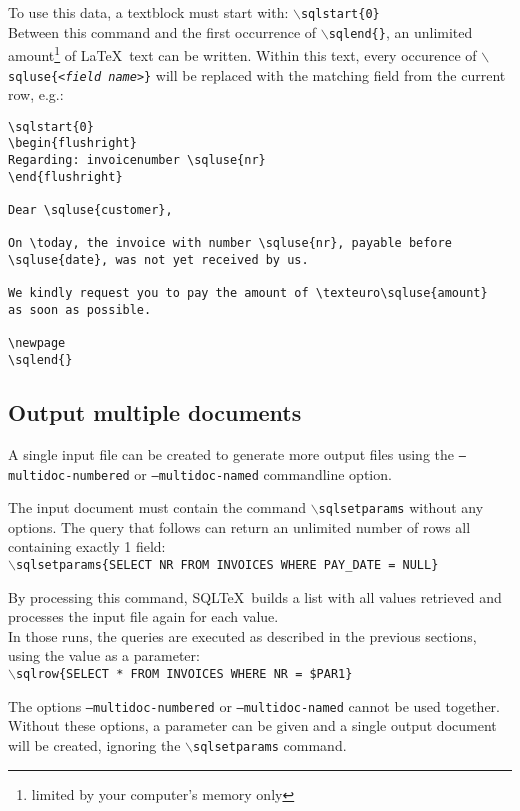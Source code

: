 \documentclass{article}
\newcommand{\bs}{\ensuremath{\backslash}}
\newcommand{\vs}{\vspace{3mm}}
\begin{document}
\vs

To use this data, a textblock must start with: \texttt{\bs sqlstart\{0\}}\\
Between this command and the first occurrence of \texttt{\bs sqlend\{\}}, an unlimited amount\footnote{ limited by your computer's memory only} of \LaTeX\ text can be written. Within this text, every occurence of \texttt{\bs sqluse\{<\textit{field name}>\}} will be replaced with the matching field from the current row, e.g.:

\noindent\begin{verbatim}
\sqlstart{0}
\begin{flushright}
Regarding: invoicenumber \sqluse{nr}
\end{flushright}

Dear \sqluse{customer},

On \today, the invoice with number \sqluse{nr}, payable before
\sqluse{date}, was not yet received by us.

We kindly request you to pay the amount of \texteuro\sqluse{amount}
as soon as possible.

\newpage
\sqlend{}
\end{verbatim}


\subsection{Output multiple documents}\label{multidoc}

A single input file can be created to generate more output files using the \texttt{--multidoc-numbered} or \texttt{--multidoc-named} commandline option.

The input document must contain the command \texttt{\bs sqlsetparams} without any options. The query that follows can return an unlimited number of rows all containing exactly 1 field: \\
\texttt{\bs sqlsetparams\{SELECT NR FROM INVOICES WHERE PAY\_DATE = NULL\}}

\vs

By processing this command, SQL\TeX\ builds a list with all values retrieved and
processes the input file again for each value.\\
In those runs, the queries are executed as described in the previous sections,
using the value as a parameter:\\
\texttt{\bs sqlrow\{SELECT * FROM INVOICES WHERE NR = \$PAR1\}}

\vs

The options \texttt{--multidoc-numbered} or \texttt{--multidoc-named} cannot be used together.\\
Without these options, a parameter can be given and a single output
document will be created, ignoring the \texttt{\bs sqlsetparams} command.
\end{document}
